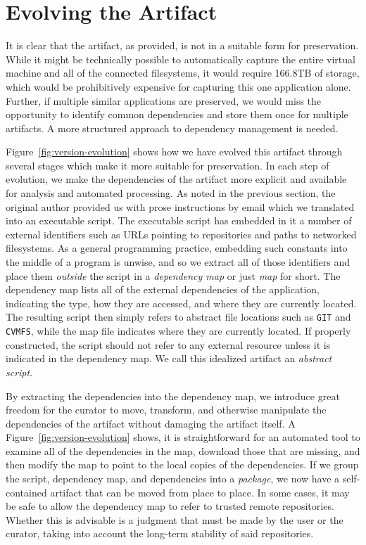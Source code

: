 \documentclass[procedia]{easychair}
\begin{document}
\fi

\section{Evolving the Artifact}

It is clear that the artifact, as provided, is not in a suitable form
for preservation.  While it might be technically possible to automatically
capture the entire virtual machine and all of the connected filesystems,
it would require 166.8TB of storage, which would be prohibitively expensive
for capturing this one application alone.  Further, if multiple
similar applications are preserved, we would miss the opportunity to identify
common dependencies and store them once for multiple artifacts.
A more structured approach to dependency management is needed.

Figure~\ref{fig:version-evolution} shows how we have evolved this artifact
through several stages which make it more suitable for preservation.
In each step of evolution, we make the dependencies of the artifact
more explicit and available for analysis and automated processing.
As noted in the previous section, the original author provided us with
prose instructions by email which we translated into an
executable script.  The executable script has embedded in it
a number of external identifiers such as URLs pointing to repositories
and paths to networked filesystems.  As a general programming practice,
embedding such constants into the middle of a program is unwise, and so
we extract all of those identifiers and place them \emph{outside} the
script in a \emph{dependency map} or just \emph{map} for short.
The dependency map lists all of the external dependencies of the application, indicating
the type, how they are accessed, and where they are currently located.
The resulting script then simply refers to abstract file locations such
as \verb$GIT$ and \verb$CVMFS$, while the map file indicates where they
are currently located. If properly constructed, the script should not refer to any external
resource unless it is indicated in the dependency map.  We call this idealized
artifact an \emph{abstract script}.

By extracting the dependencies into the dependency map,
we introduce great freedom for the curator to move, transform, and otherwise
manipulate the dependencies of the artifact without damaging the artifact itself.
A Figure~\ref{fig:version-evolution} shows, it is straightforward for an
automated tool to examine
all of the dependencies in the map, download those that are missing,
and then modify the map to point to the local copies of the dependencies.
If we group the script, dependency map, and dependencies into a \emph{package},
we now have a self-contained artifact that can be moved from place to place.
In some cases, it may be safe to allow the dependency map to refer to 
trusted remote repositories.  Whether this is advisable is a judgment that
must be made by the user or the curator, taking into account the long-term
stability of said repositories.
\end{document}
